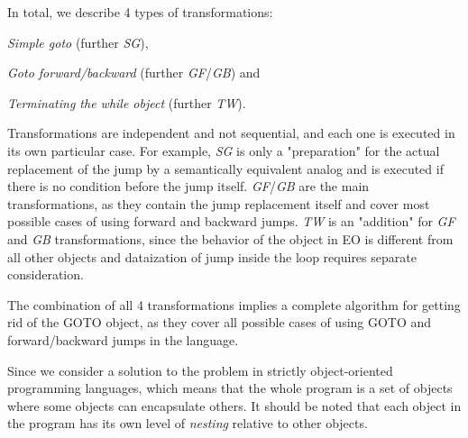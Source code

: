 \documentclass[sigplan,review,11pt,nonacm,natbib=false]{acmart}
\theoremstyle{theorems}
\begin{document}
    In total, we describe 4 types of transformations:
    \begin{inparaenum}[1)]
    \item \emph{Simple goto} (further \emph{SG}),
    \item \emph{Goto forward/backward} (further \emph{GF}/\emph{GB}) and
    \item \emph{Terminating the while object} (further \emph{TW}).

    Transformations are independent and not sequential, and each one is executed in its own particular case.
    For example, \emph{SG} is only a "preparation" for the actual replacement of the jump by a semantically equivalent analog and is executed if there is no condition before the jump itself.
    \emph{GF}/\emph{GB} are the main transformations, as they contain the jump replacement itself and cover most possible cases of using forward and backward jumps.
    \emph{TW} is an "addition" for \emph{GF} and \emph{GB} transformations, since the behavior of the  object in EO is different from all other objects and dataization of jump inside the loop requires separate consideration.
    \end{inparaenum}


    The combination of all 4 transformations implies a complete algorithm for getting rid of the GOTO object, as they cover all possible cases of using GOTO and forward/backward jumps in the language.

    Since we consider a solution to the problem in strictly object-oriented programming languages, which means that the whole program is a set of objects where some objects can encapsulate others.
    It should be noted that each object in the program has its own level of \emph{nesting} relative to other objects.
\end{document}

